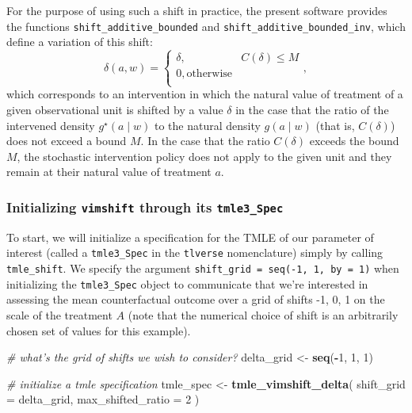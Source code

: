 \documentclass[12pt, krantz2,]{krantz}
\newenvironment{Shaded}{\begin{snugshade}}{\end{snugshade}}
\newcommand{\CommentTok}[1]{\textcolor[rgb]{0.37,0.37,0.37}{\textit{#1}}}
\newcommand{\DataTypeTok}[1]{\textcolor[rgb]{0.27,0.27,0.27}{#1}}
\newcommand{\DecValTok}[1]{\textcolor[rgb]{0.06,0.06,0.06}{#1}}
\newcommand{\KeywordTok}[1]{\textcolor[rgb]{0.27,0.27,0.27}{\textbf{#1}}}
\newcommand{\NormalTok}[1]{#1}
\newcommand{\OperatorTok}[1]{\textcolor[rgb]{0.43,0.43,0.43}{\textbf{#1}}}
\newcommand{\StringTok}[1]{\textcolor[rgb]{0.5,0.5,0.5}{#1}}
\theoremstyle{definition}
\theoremstyle{definition}
\theoremstyle{definition}
\newcommand{\1}{\mathbbm{1}}
\begin{document}
For the purpose of using such a shift in practice, the present software
provides the functions \texttt{shift\_additive\_bounded} and
\texttt{shift\_additive\_bounded\_inv}, which define a variation of this shift:
\begin{equation}
  \delta(a, w) =
    \begin{cases}
      \delta, & C(\delta) \leq M \\
      0, \text{otherwise} \\
    \end{cases},
  \label{eq:shift-simple}
\end{equation}
which corresponds to an intervention in which the natural value of treatment
of a given observational unit is shifted by a value \(\delta\) in the case that
the ratio of the intervened density \(g^{\star}(a \mid w)\) to the natural
density \(g(a \mid w)\) (that is, \(C(\delta)\)) does not exceed a bound \(M\). In
the case that the ratio \(C(\delta)\) exceeds the bound \(M\), the stochastic
intervention policy does not apply to the given unit and they remain at their
natural value of treatment \(a\).

\hypertarget{initializing-vimshift-through-its-tmle3_spec}{%
\subsubsection{\texorpdfstring{Initializing \texttt{vimshift} through its \texttt{tmle3\_Spec}}{Initializing vimshift through its tmle3\_Spec}}\label{initializing-vimshift-through-its-tmle3_spec}}

To start, we will initialize a specification for the TMLE of our parameter of
interest (called a \texttt{tmle3\_Spec} in the \texttt{tlverse} nomenclature) simply by calling
\texttt{tmle\_shift}. We specify the argument \texttt{shift\_grid\ =\ seq(-1,\ 1,\ by\ =\ 1)}
when initializing the \texttt{tmle3\_Spec} object to communicate that we're interested
in assessing the mean counterfactual outcome over a grid of shifts -1, 0, 1 on the scale of the treatment \(A\) (note that the numerical
choice of shift is an arbitrarily chosen set of values for this example).

\begin{Shaded}
\begin{Highlighting}[]
\CommentTok{# what's the grid of shifts we wish to consider?}
\NormalTok{delta_grid <-}\StringTok{ }\KeywordTok{seq}\NormalTok{(}\OperatorTok{-}\DecValTok{1}\NormalTok{, }\DecValTok{1}\NormalTok{, }\DecValTok{1}\NormalTok{)}

\CommentTok{# initialize a tmle specification}
\NormalTok{tmle_spec <-}\StringTok{ }\KeywordTok{tmle_vimshift_delta}\NormalTok{(}
  \DataTypeTok{shift_grid =}\NormalTok{ delta_grid,}
  \DataTypeTok{max_shifted_ratio =} \DecValTok{2}
\NormalTok{)}
\end{Highlighting}
\end{Shaded}
\end{document}
